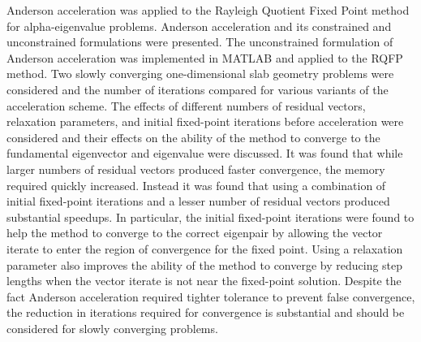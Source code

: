 Anderson acceleration was applied to the Rayleigh Quotient Fixed Point method for alpha-eigenvalue problems. Anderson acceleration and its constrained and unconstrained formulations were presented. The unconstrained formulation of Anderson acceleration was implemented in MATLAB and applied to the RQFP method. Two slowly converging one-dimensional slab geometry problems were considered and the number of iterations compared for various variants of the acceleration scheme. The effects of different numbers of residual vectors, relaxation parameters, and initial fixed-point iterations before acceleration were considered and their effects on the ability of the method to converge to the fundamental eigenvector and eigenvalue were discussed. It was found that while larger numbers of residual vectors produced faster convergence, the memory required quickly increased. Instead it was found that using a combination of initial fixed-point iterations and a lesser number of residual vectors produced substantial speedups. In particular, the initial fixed-point iterations were found to help the method to converge to the correct eigenpair by allowing the vector iterate to enter the region of convergence for the fixed point. Using a relaxation parameter also improves the ability of the method to converge by reducing step lengths when the vector iterate is not near the fixed-point solution. Despite the fact Anderson acceleration required tighter tolerance to prevent false convergence, the reduction in iterations required for convergence is substantial and should be considered for slowly converging problems. 